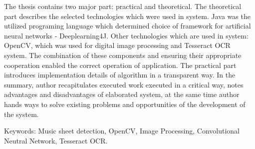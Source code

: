 \documentclass[a4paper,12pt]{article}
\begin{document}
\begin{spacing}{1.45}
    The thesis contains two major part: practical and theoretical.
    The theoretical part describes the selected technologies which 
    were used in system. Java was the utilized programing language which 
    determined choice of framework for artificial neural networks - Deeplearning4J. Other technologies which are used in system: OpenCV, which was used for digital image processing and Tesseract OCR system. The combination of these components and ensuring their appropriate cooperation enabled the correct operation of application. The practical part introduces implementation details of algorithm in a transparent way. In the summary, author recapitulates executed work executed in a critical way, notes advantages and disadvantages of elaborated system, at the same time author hands ways to solve existing problems and opportunities of the development of the system.
    
    Keywords: Music sheet detection, OpenCV, Image Processing, Convolutional Neutral Network, Tesseract OCR.
    \end{spacing}
	
\end{document}
